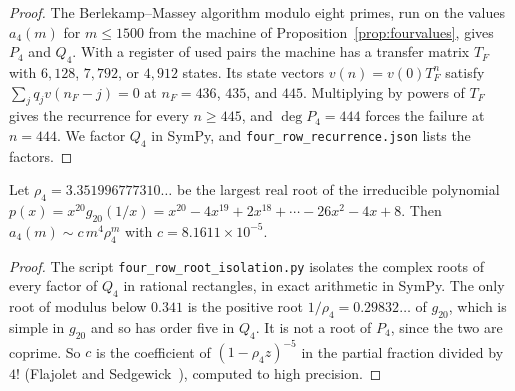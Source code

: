 \begin{proof}
The Berlekamp--Massey algorithm modulo eight primes, run on the values $a_4(m)$ for $m\le1500$ from the machine of Proposition~\ref{prop:fourvalues}, gives $P_4$ and $Q_4$. With a register of used pairs the machine has a transfer matrix $T_F$ with $6{,}128$, $7{,}792$, or $4{,}912$ states. Its state vectors $v(n)=v(0)T_F^n$ satisfy $\sum_jq_jv(n_F-j)=0$ at $n_F=436$, $435$, and $445$. Multiplying by powers of $T_F$ gives the recurrence for every $n\ge445$, and $\deg P_4=444$ forces the failure at $n=444$. We factor $Q_4$ in SymPy, and \texttt{four\_row\_\allowbreak recurrence.json} lists the factors.
\end{proof}

\begin{corollary}\label{cor:fourgrowth}
Let $\rho_4=3.351996777310\ldots$ be the largest real root of the irreducible polynomial $p(x)=x^{20}g_{20}(1/x)=x^{20}-4x^{19}+2x^{18}+\cdots-26x^2-4x+8$. Then $a_4(m)\sim c\,m^4\rho_4^m$ with $c=8.1611\times10^{-5}$.
\end{corollary}

\begin{proof}
The script \texttt{four\_row\_root\_isolation.py} isolates the complex roots of every factor of $Q_4$ in rational rectangles, in exact arithmetic in SymPy. The only root of modulus below $0.341$ is the positive root $1/\rho_4=0.29832\ldots$ of $g_{20}$, which is simple in $g_{20}$ and so has order five in $Q_4$. It is not a root of $P_4$, since the two are coprime. So $c$ is the coefficient of $(1-\rho_4 z)^{-5}$ in the partial fraction divided by $4!$ (Flajolet and Sedgewick~\cite[Section~IV.5]{flajolet2009}), computed to high precision.
\end{proof}